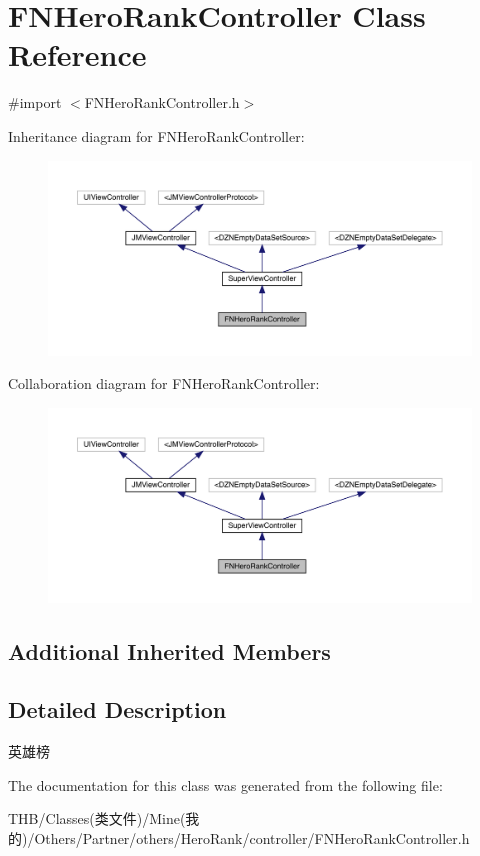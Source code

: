 \hypertarget{interface_f_n_hero_rank_controller}{}\section{F\+N\+Hero\+Rank\+Controller Class Reference}
\label{interface_f_n_hero_rank_controller}


{\ttfamily \#import $<$F\+N\+Hero\+Rank\+Controller.\+h$>$}



Inheritance diagram for F\+N\+Hero\+Rank\+Controller\+:\nopagebreak
\begin{figure}[H]
\begin{center}
\leavevmode
\includegraphics[width=350pt]{interface_f_n_hero_rank_controller__inherit__graph}
\end{center}
\end{figure}


Collaboration diagram for F\+N\+Hero\+Rank\+Controller\+:\nopagebreak
\begin{figure}[H]
\begin{center}
\leavevmode
\includegraphics[width=350pt]{interface_f_n_hero_rank_controller__coll__graph}
\end{center}
\end{figure}
\subsection*{Additional Inherited Members}


\subsection{Detailed Description}
英雄榜 

The documentation for this class was generated from the following file\+:\begin{DoxyCompactItemize}
\item 
T\+H\+B/\+Classes(类文件)/\+Mine(我的)/\+Others/\+Partner/others/\+Hero\+Rank/controller/F\+N\+Hero\+Rank\+Controller.\+h\end{DoxyCompactItemize}
